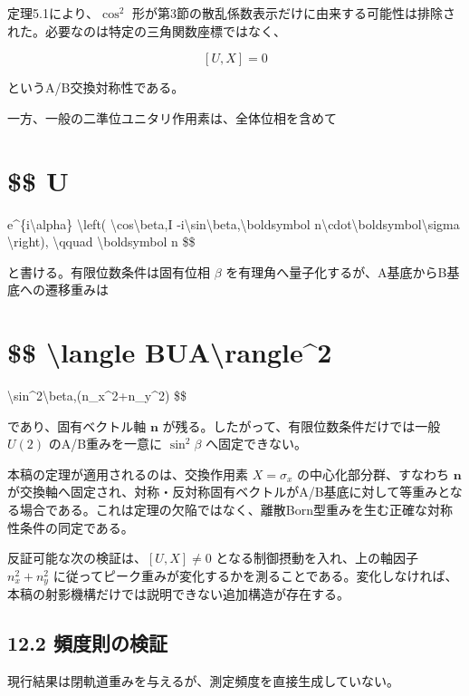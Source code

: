 \documentclass[
  a4paper,
  10pt]{article}
\begin{document}
定理5.1により、\(\cos^2\)
形が第3節の散乱係数表示だけに由来する可能性は排除された。必要なのは特定の三角関数座標ではなく、

\[
[U,X]=0
\]

というA/B交換対称性である。

一方、一般の二準位ユニタリ作用素は、全体位相を含めて

\section{\$\$ U}\label{-u}

e\^{}\{i\textbackslash alpha\} \textbackslash left(
\textbackslash cos\textbackslash beta,I
-i\textbackslash sin\textbackslash beta,\textbackslash boldsymbol
n\textbackslash cdot\textbackslash boldsymbol\textbackslash sigma
\textbackslash right), \textbackslash qquad
\textbar\textbackslash boldsymbol n \$\$

と書ける。有限位数条件は固有位相 \(\beta\)
を有理角へ量子化するが、A基底からB基底への遷移重みは

\section{\$\$ \textbar\textbackslash langle
B\textbar U\textbar A\textbackslash rangle\textbar\^{}2}\label{-langle-buarangle2}

\textbackslash sin\^{}2\textbackslash beta,(n\_x\^{}2+n\_y\^{}2) \$\$

であり、固有ベクトル軸 \(\boldsymbol n\)
が残る。したがって、有限位数条件だけでは一般 \(U(2)\) のA/B重みを一意に
\(\sin^2\beta\) へ固定できない。

本稿の定理が適用されるのは、交換作用素 \(X=\sigma_x\)
の中心化部分群、すなわち \(\boldsymbol n\)
が交換軸へ固定され、対称・反対称固有ベクトルがA/B基底に対して等重みとなる場合である。これは定理の欠陥ではなく、離散Born型重みを生む正確な対称性条件の同定である。

反証可能な次の検証は、\([U,X]\ne0\) となる制御摂動を入れ、上の軸因子
\(n_x^2+n_y^2\)
に従ってピーク重みが変化するかを測ることである。変化しなければ、本稿の射影機構だけでは説明できない追加構造が存在する。

\subsection{12.2
頻度則の検証}\label{122-ux983bux5ea6ux5247ux306eux691cux8a3c}

現行結果は閉軌道重みを与えるが、測定頻度を直接生成していない。
\end{document}
